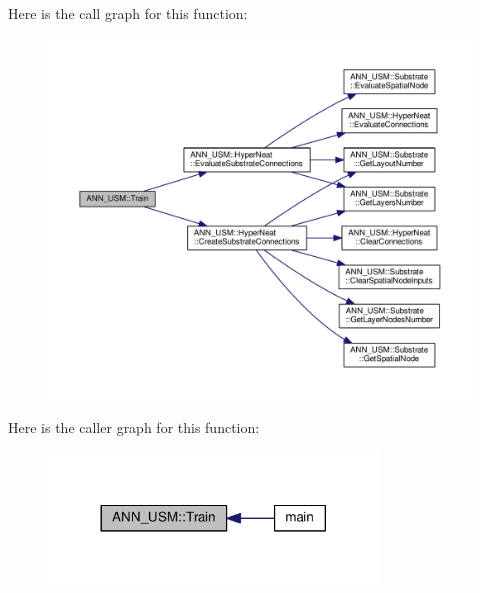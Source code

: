 Here is the call graph for this function\-:
\nopagebreak
\begin{figure}[H]
\begin{center}
\leavevmode
\includegraphics[width=350pt]{namespace_a_n_n___u_s_m_a51921a1b2bc111c4b856df925b0c6581_cgraph}
\end{center}
\end{figure}




Here is the caller graph for this function\-:
\nopagebreak
\begin{figure}[H]
\begin{center}
\leavevmode
\includegraphics[width=248pt]{namespace_a_n_n___u_s_m_a51921a1b2bc111c4b856df925b0c6581_icgraph}
\end{center}
\end{figure}


